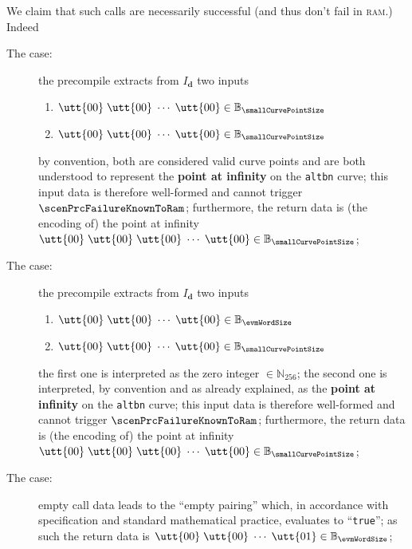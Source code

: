 We claim that such calls are necessarily successful (and thus don't fail in \textsc{ram}.)
Indeed
\begin{description}
	\item[The \instEcadd{} case:] 
		the precompile extracts from $I_\textbf{d}$ two inputs
		\begin{enumerate}
		        \item $
				\utt{00} \;
				\utt{00} \; \cdots \;
				\utt{00} \in \mathbb{B}_{\smallCurvePointSize}$
		        \item $
				\utt{00} \;
				\utt{00} \; \cdots \;
				\utt{00} \in \mathbb{B}_{\smallCurvePointSize}$
		\end{enumerate}
		by \evm{} convention, both are considered valid curve points and are both understood to represent the \textbf{point at infinity} on the \texttt{altbn} curve;
		this input data is therefore well-formed and cannot trigger $\scenPrcFailureKnownToRam$; 
		furthermore, the return data is (the \evm{} encoding of) the point at infinity
		$
		\utt{00} \;
		\utt{00} \;
		\utt{00} \; \cdots \;
		\utt{00} \in \mathbb{B}_{\smallCurvePointSize}$;
	\item[The \instEcmul{} case:] 
		the precompile extracts from $I_\textbf{d}$ two inputs
		\begin{enumerate}
		        \item $
				\utt{00} \;
				\utt{00} \; \cdots \;
				\utt{00} \in \mathbb{B}_{\evmWordSize}$
		        \item $
				\utt{00} \;
				\utt{00} \; \cdots \;
				\utt{00} \in \mathbb{B}_{\smallCurvePointSize}$
		\end{enumerate}
		the first one is interpreted as the zero integer $\in \mathbb{N}_{256}$;
		the second one is interpreted, by \evm{} convention and as already explained, as the \textbf{point at infinity} on the \texttt{altbn} curve;
		this input data is therefore well-formed and cannot trigger $\scenPrcFailureKnownToRam$; 
		furthermore, the return data is (the \evm{} encoding of) the point at infinity
		$
		\utt{00} \;
		\utt{00} \;
		\utt{00} \; \cdots \;
		\utt{00} \in \mathbb{B}_{\smallCurvePointSize}$;
	\item[The \instEcpairing{} case:]
		empty call data leads to the ``empty pairing'' which, in accordance with \evm{} specification and standard mathematical practice, evaluates to ``\texttt{true}'';
		as such the return data is
		$
		\utt{00} \;
		\utt{00} \; \cdots \;
		\utt{01} \in \mathbb{B}_{\evmWordSize}$;
\end{description}

